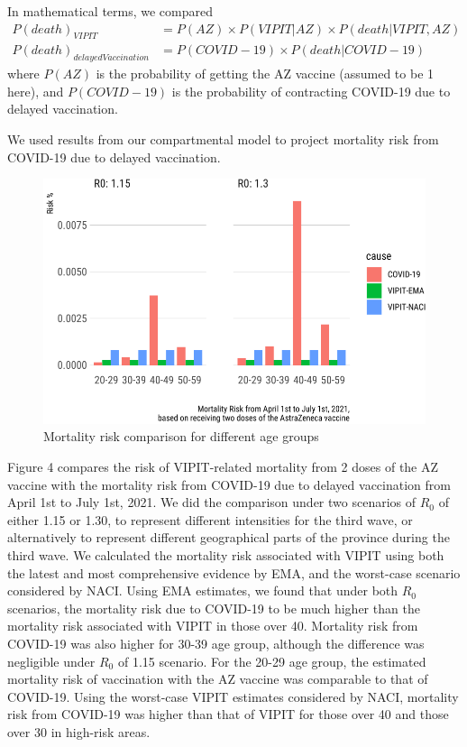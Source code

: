 \documentclass[]{interact}
\theoremstyle{plain}%
\theoremstyle{definition}
\theoremstyle{remark}
\begin{document}
In mathematical terms, we compared \[
\begin{aligned}
P(death)_{VIPIT}  &= P(AZ) \times P(VIPIT|AZ) \times P(death|VIPIT, AZ) \\
P(death)_{delayedVaccination} &= P(COVID-19) \times P(death|COVID-19)
\end{aligned}
\] where \(P(AZ)\) is the probability of getting the AZ vaccine (assumed
to be 1 here), and \(P(COVID-19)\) is the probability of contracting
COVID-19 due to delayed vaccination.

We used results from our compartmental model to project mortality risk
from COVID-19 due to delayed vaccination.

\begin{figure}

{\centering \includegraphics[width=0.7\linewidth]{theCaseforAZ_files/figure-latex/covidvsvipit-1} 

}

\caption{Mortality risk comparison for different age groups}\label{fig:covidvsvipit}
\end{figure}

Figure 4 compares the risk of VIPIT-related mortality from 2 doses of
the AZ vaccine with the mortality risk from COVID-19 due to delayed
vaccination from April 1st to July 1st, 2021. We did the comparison
under two scenarios of \(R_0\) of either 1.15 or 1.30, to represent
different intensities for the third wave, or alternatively to represent
different geographical parts of the province during the third wave. We
calculated the mortality risk associated with VIPIT using both the
latest and most comprehensive evidence by EMA, and the worst-case
scenario considered by NACI. Using EMA estimates, we found that under
both \(R_0\) scenarios, the mortality risk due to COVID-19 to be much
higher than the mortality risk associated with VIPIT in those over 40.
Mortality risk from COVID-19 was also higher for 30-39 age group,
although the difference was negligible under \(R_0\) of 1.15 scenario.
For the 20-29 age group, the estimated mortality risk of vaccination
with the AZ vaccine was comparable to that of COVID-19. Using the
worst-case VIPIT estimates considered by NACI, mortality risk from
COVID-19 was higher than that of VIPIT for those over 40 and those over
30 in high-risk areas.
\end{document}
